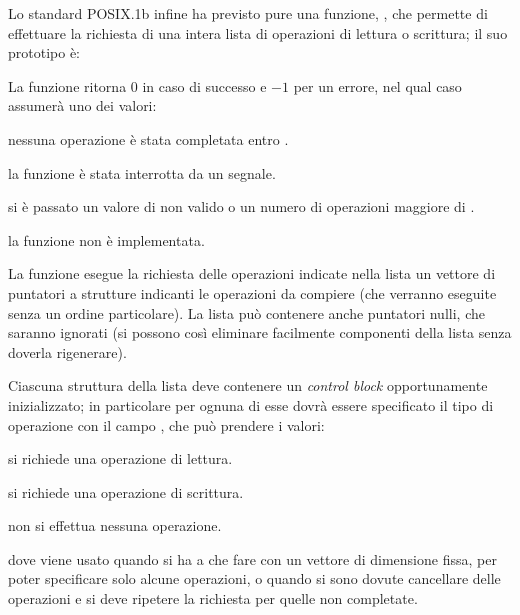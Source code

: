 Lo standard POSIX.1b infine ha previsto pure una funzione, ,
che permette di effettuare la richiesta di una intera lista di operazioni di
lettura o scrittura; il suo prototipo è:


\begin{funcproto}{

}

{La funzione ritorna $0$ in caso di successo e $-1$ per un errore, nel qual
  caso  assumerà uno dei valori: 
  \begin{errlist}
    \item[\errcode{EAGAIN}] nessuna operazione è stata completata entro
      .
    \item[\errcode{EINTR}] la funzione è stata interrotta da un segnale.
    \item[\errcode{EINVAL}] si è passato un valore di  non valido
      o un numero di operazioni  maggiore di
      .
    \item[\errcode{ENOSYS}] la funzione non è implementata.
  \end{errlist}
}
\end{funcproto}

La funzione esegue la richiesta delle  operazioni indicate nella
lista  un vettore di puntatori a strutture 
indicanti le operazioni da compiere (che verranno eseguite senza un ordine
particolare). La lista può contenere anche puntatori nulli, che saranno
ignorati (si possono così eliminare facilmente componenti della lista senza
doverla rigenerare).

Ciascuna struttura  della lista deve contenere un
\textit{control block} opportunamente inizializzato; in particolare per
ognuna di esse dovrà essere specificato il tipo di operazione con il campo
, che può prendere i valori:
\begin{basedescript}{\desclabelwidth{2.0cm}}
\item[\constd{LIO\_READ}]  si richiede una operazione di lettura.
\item[\constd{LIO\_WRITE}] si richiede una operazione di scrittura.
\item[\constd{LIO\_NOP}] non si effettua nessuna operazione.
\end{basedescript}
dove  viene usato quando si ha a che fare con un vettore di
dimensione fissa, per poter specificare solo alcune operazioni, o quando si
sono dovute cancellare delle operazioni e si deve ripetere la richiesta per
quelle non completate. 

